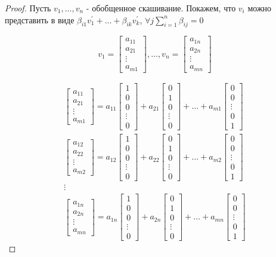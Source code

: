 \documentclass[16pt]{article}
\theoremstyle{definition}
\begin{document}
\begin{proof}
	Пусть $v_1, \dots, v_n$ - обобщенное скашивание. Покажем, что $v_i$ можно представить в виде $\beta_{i1}v^{'}_1 + \dots + \beta_{ik}v^{'}_k$, $\forall j \sum_{i=1}^n\beta_{ij} = 0 $
\\
\def\vf{
\begin{bmatrix}
    a_{11} \\
    a_{21} \\
    \vdots \\
    a_{m1}
\end{bmatrix}}

\def\vs{
\begin{bmatrix}
    a_{12} \\
    a_{22} \\
    \vdots \\
    a_{m2}
\end{bmatrix}}

\def\vn{
\begin{bmatrix}
    a_{1n} \\
    a_{2n} \\
    \vdots \\
    a_{mn}
\end{bmatrix}}

\def\basef{
\begin{bmatrix}
    1 \\
    0 \\
    0 \\
    \vdots \\
    0
\end{bmatrix}}

\def\bases{
\begin{bmatrix}
    0 \\
    1 \\
    0 \\
    \vdots \\
    0
\end{bmatrix}}

\def\basem{
\begin{bmatrix}
    0 \\
    0 \\
    \vdots \\
    0 \\
    1
\end{bmatrix}}

\begin{equation}
v_1 = \vf, \dots, v_n = \vn
\end{equation}

\begin{align*} 
\vf = a_{11}\basef + a_{21}\bases + \dots + a_{m1}\basem
\\
\vs = a_{12}\basef + a_{22}\bases + \dots + a_{m2}\basem
\\
\vdots
\\
\vn = a_{1n}\basef + a_{2n}\bases + \dots + a_{mn}\basem
\end{align*}


\end{proof}
\end{document}
